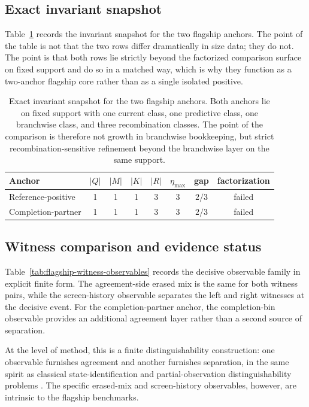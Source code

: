 \documentclass[11pt]{article}
\theoremstyle{definition}
\begin{document}
\subsection{Exact invariant snapshot}

Table~\ref{tab:exact-invariant-snapshots} records the invariant snapshot for the two flagship anchors. The point of the table is not that the two rows differ dramatically in size data; they do not. The point is that both rows lie strictly beyond the factorized comparison surface on fixed support and do so in a matched way, which is why they function as a two-anchor flagship core rather than as a single isolated positive.

\begin{table}[t]
\centering
\small
\caption{Exact invariant snapshot for the two flagship anchors. Both anchors lie on fixed support with one current class, one predictive class, one branchwise class, and three recombination classes. The point of the comparison is therefore not growth in branchwise bookkeeping, but strict recombination-sensitive refinement beyond the branchwise layer on the same support.}
\label{tab:exact-invariant-snapshots}
\begin{tabular}{lccccccc}
\toprule
Anchor & $|Q|$ & $|M|$ & $|K|$ & $|R|$ & $\eta_{\max}$ & gap & factorization \\
\midrule
Reference-positive & 1 & 1 & 1 & 3 & 3 & $2/3$ & failed \\
Completion-partner & 1 & 1 & 1 & 3 & 3 & $2/3$ & failed \\
\bottomrule
\end{tabular}
\end{table}
 
\subsection{Witness comparison and evidence status}

Table~\ref{tab:flagship-witness-observables} records the decisive observable family in explicit finite form. The agreement-side erased mix is the same for both witness pairs, while the screen-history observable separates the left and right witnesses at the decisive event. For the completion-partner anchor, the completion-bin observable provides an additional agreement layer rather than a second source of separation.

At the level of method, this is a finite distinguishability construction: one observable furnishes agreement and another furnishes separation, in the same spirit as classical state-identification and partial-observation distinguishability problems \cite{Gill1961,WangLafortuneLin2007}. The specific erased-mix and screen-history observables, however, are intrinsic to the flagship benchmarks.
\end{document}
